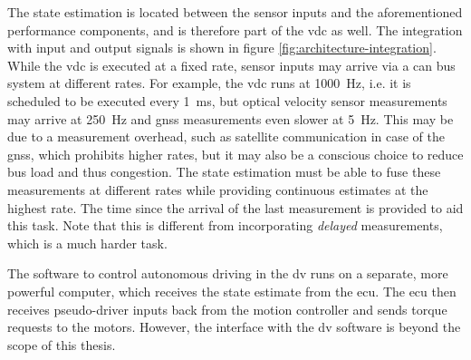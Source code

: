 The state estimation is located between the sensor inputs and the aforementioned performance components, and is therefore part of the \gls{vdc} as well. The integration with input and output signals is shown in figure \ref{fig:architecture-integration}. While the \gls{vdc} is executed at a fixed rate, sensor inputs may arrive via a \gls{can} bus system at different rates. For example, the \gls{vdc} runs at \SI{1000}{\hertz}, i.e. it is scheduled to be executed every \SI{1}{\milli\second}, but optical velocity sensor measurements may arrive at \SI{250}{\hertz} and \gls{gnss} measurements even slower at \SI{5}{\hertz}. This may be due to a measurement overhead, such as satellite communication in case of the \gls{gnss}, which prohibits higher rates, but it may also be a conscious choice to reduce bus load and thus congestion. The state estimation must be able to fuse these measurements at different rates while providing continuous estimates at the highest rate. The time since the arrival of the last measurement is provided to aid this task. Note that this is different from incorporating \textit{delayed} measurements, which is a much harder task.

The software to control autonomous driving in the \gls{dv} runs on a separate, more powerful computer, which receives the state estimate from the \gls{ecu}. The \gls{ecu} then receives pseudo-driver inputs back from the motion controller and sends torque requests to the motors. However, the interface with the \gls{dv} software is beyond the scope of this thesis.
